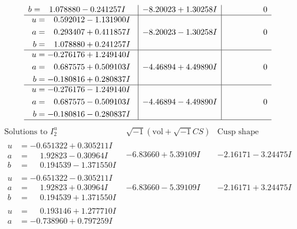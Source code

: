 \documentclass[1p]{elsarticle_modified}
\theoremstyle{definition}
\newcommand{\I}{\sqrt{-1}}
\begin{document}
$$\begin{array}{c|c|c}
\begin{aligned}
b &= \phantom{-}1.078880 - 0.241257 I\end{aligned}
 & -8.20023 + 1.30258 I & \phantom{-0.000000 } 0 \\ \hline\begin{aligned}
u &= \phantom{-}0.592012 - 1.131900 I \\
a &= \phantom{-}0.293407 + 0.411857 I \\
b &= \phantom{-}1.078880 + 0.241257 I\end{aligned}
 & -8.20023 - 1.30258 I & \phantom{-0.000000 } 0 \\ \hline\begin{aligned}
u &= -0.276176 + 1.249140 I \\
a &= \phantom{-}0.687575 + 0.509103 I \\
b &= -0.180816 + 0.280837 I\end{aligned}
 & -4.46894 + 4.49890 I & \phantom{-0.000000 } 0 \\ \hline\begin{aligned}
u &= -0.276176 - 1.249140 I \\
a &= \phantom{-}0.687575 - 0.509103 I \\
b &= -0.180816 - 0.280837 I\end{aligned}
 & -4.46894 - 4.49890 I & \phantom{-0.000000 } 0\\
 \hline 
 \end{array}$$\newpage$$\begin{array}{c|c|c}  
\text{Solutions to }I^u_{2}& \I (\text{vol} + \sqrt{-1}CS) & \text{Cusp shape}\\
 \hline 
\begin{aligned}
u &= -0.651322 + 0.305211 I \\
a &= \phantom{-}1.92823 - 0.30964 I \\
b &= \phantom{-}0.194539 - 1.371550 I\end{aligned}
 & -6.83660 + 5.39109 I & -2.16171 - 3.24475 I \\ \hline\begin{aligned}
u &= -0.651322 - 0.305211 I \\
a &= \phantom{-}1.92823 + 0.30964 I \\
b &= \phantom{-}0.194539 + 1.371550 I\end{aligned}
 & -6.83660 - 5.39109 I & -2.16171 + 3.24475 I \\ \hline\begin{aligned}
u &= \phantom{-}0.193146 + 1.277710 I \\
a &= -0.738960 + 0.797259 I \\

\end{aligned}
\end{array}$$
\end{document}
